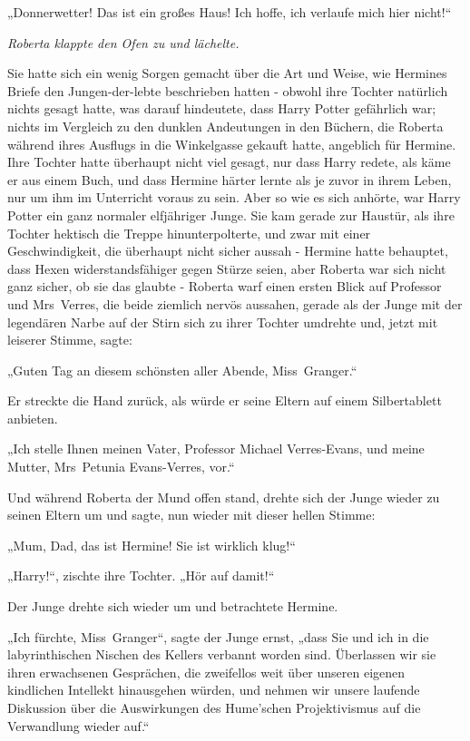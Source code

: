 {„Donnerwetter! Das ist ein großes Haus! Ich hoffe, ich verlaufe mich hier nicht!“

\emph{Roberta klappte den Ofen zu und lächelte.}

Sie hatte sich ein wenig Sorgen gemacht über die Art und Weise, wie Hermines Briefe den Jungen-der-lebte beschrieben hatten - obwohl ihre Tochter natürlich nichts gesagt hatte, was darauf hindeutete, dass Harry Potter gefährlich war; nichts im Vergleich zu den dunklen Andeutungen in den Büchern, die Roberta während ihres Ausflugs in die Winkelgasse gekauft hatte, angeblich für Hermine. Ihre Tochter hatte überhaupt nicht viel gesagt, nur dass Harry redete, als käme er aus einem Buch, und dass Hermine härter lernte als je zuvor in ihrem Leben, nur um ihm im Unterricht voraus zu sein. Aber so wie es sich anhörte, war Harry Potter ein ganz normaler elfjähriger Junge. Sie kam gerade zur Haustür, als ihre Tochter hektisch die Treppe hinunterpolterte, und zwar mit einer Geschwindigkeit, die überhaupt nicht sicher aussah - Hermine hatte behauptet, dass Hexen widerstandsfähiger gegen Stürze seien, aber Roberta war sich nicht ganz sicher, ob sie das glaubte - Roberta warf einen ersten Blick auf Professor und Mrs~Verres, die beide ziemlich nervös aussahen, gerade als der Junge mit der legendären Narbe auf der Stirn sich zu ihrer Tochter umdrehte und, jetzt mit leiserer Stimme, sagte:

„Guten Tag an diesem schönsten aller Abende, Miss~Granger.“

Er streckte die Hand zurück, als würde er seine Eltern auf einem Silbertablett anbieten.

„Ich stelle Ihnen meinen Vater, Professor Michael Verres-Evans, und meine Mutter, Mrs~Petunia Evans-Verres, vor.“

Und während Roberta der Mund offen stand, drehte sich der Junge wieder zu seinen Eltern um und sagte, nun wieder mit dieser hellen Stimme:

„Mum, Dad, das ist Hermine! Sie ist wirklich klug!“

„Harry!“, zischte ihre Tochter. „Hör auf damit!“

Der Junge drehte sich wieder um und betrachtete Hermine.

„Ich fürchte, Miss~Granger“, sagte der Junge ernst, „dass Sie und ich in die labyrinthischen Nischen des Kellers verbannt worden sind. Überlassen wir sie ihren erwachsenen Gesprächen, die zweifellos weit über unseren eigenen kindlichen Intellekt hinausgehen würden, und nehmen wir unsere laufende Diskussion über die Auswirkungen des Hume'schen Projektivismus auf die Verwandlung wieder auf.“

}
